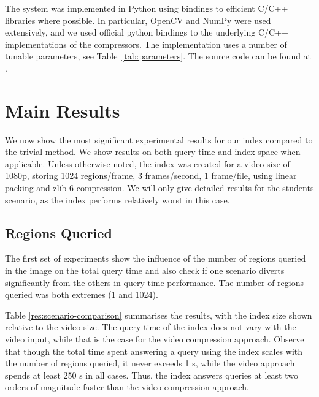 The system was implemented in Python using bindings to efficient C/C++ libraries where possible. In particular, OpenCV and NumPy were used extensively, and we used official python bindings to the underlying C/C++ implementations of the compressors. The implementation uses a number of tunable parameters, see Table~\ref{tab:parameters}. The source code can be found at \cite{sourcecode}.

\section{Main Results}
We now show the most significant experimental results for our index compared to the trivial method. %
We show results on both query time and index space when applicable. Unless otherwise noted, the index was created for a video size of 1080p, storing 1024 regions/frame, 3 frames/second, 1 frame/file, using linear packing and zlib-6 compression. We will only give detailed results for the students scenario, as the index performs relatively worst in this case. 


\subsection{Regions Queried}
The first set of experiments show the influence of the number of regions queried in the image on the total query time and also check if one scenario diverts significantly from the others in query time performance. The number of regions queried was both extremes (1 and 1024). 

Table \ref{res:scenario-comparison} summarises the results, with the index size shown relative to the video size. The query time of the index does not vary with the video input, while that is the case for the video compression approach. Observe that though the total time spent answering a query using the index scales with the number of regions queried, it never exceeds 1 s, while the video approach spends at least 250 s in all cases. Thus, the index answers queries at least two orders of magnitude faster than the video compression approach.

